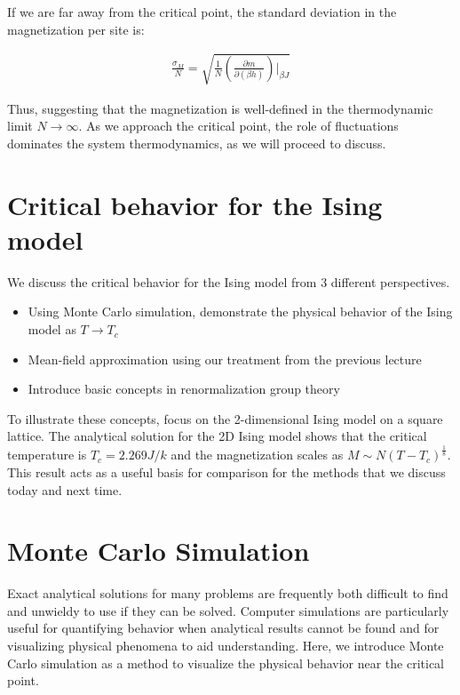 \documentclass[book.tex]{subfiles}
\begin{document}
If we are far away from the critical point, the standard deviation in the magnetization per site is:

\begin{align}\label{Eq7}
\frac{\sigma_{M}}{N} = \sqrt{\frac{1}{N}\left(\frac{\partial m}{\partial (\beta h)}\right)\bigg|_{\beta J}}
\end{align}

Thus, suggesting that the magnetization is well-defined in the thermodynamic limit $N \rightarrow \infty$. As we approach the critical point, the role of fluctuations dominates the system thermodynamics, as we will proceed to discuss.

\section{Critical behavior for the Ising model}

We discuss the critical behavior for the Ising model from 3 different perspectives.

\begin{itemize}
\item Using Monte Carlo simulation, demonstrate the physical behavior of the Ising model as $T \rightarrow T_c$
\item Mean-field approximation using our treatment from the previous lecture
\item Introduce basic concepts in renormalization group theory
\end{itemize}

To illustrate these concepts, focus on the 2-dimensional Ising model on a square lattice. The analytical solution for the 2D Ising model \cite{Onsager1944} shows that the critical temperature is $T_c = 2.269 J/k$ and the magnetization scales as $M \sim N(T-T_c)^{\frac{1}{8}}$. This result acts as a useful basis for comparison for the methods that we discuss today and next time.

\section{Monte Carlo Simulation}
Exact analytical solutions for many problems are frequently both difficult to find and unwieldy to use if they can be solved. Computer simulations are particularly useful for quantifying behavior when analytical results cannot be found and for visualizing physical phenomena to aid understanding. Here, we introduce Monte Carlo simulation as a method to visualize the physical behavior near the critical point. %
\end{document}
